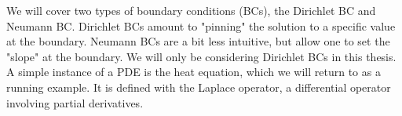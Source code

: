 We will cover two types of boundary conditions (BCs), the Dirichlet BC and Neumann BC. 
Dirichlet BCs amount to "pinning" the solution to a specific value at the boundary.
Neumann BCs are a bit less intuitive, but allow one to set the "slope" at the boundary. We will only be considering Dirichlet BCs in this thesis.
\\A simple instance of a PDE is the heat equation, which we will return to as a running example. It is defined with the Laplace operator, a differential operator involving partial derivatives. 
